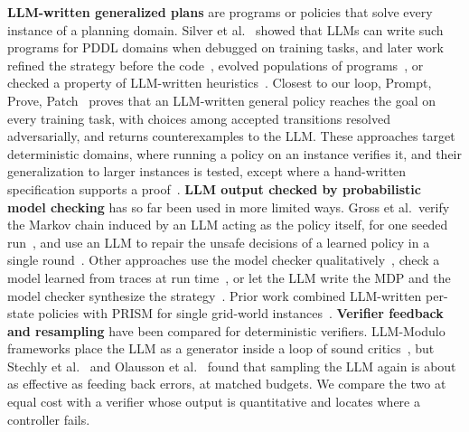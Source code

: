 \textbf{LLM-written generalized plans} are programs or policies that solve every instance of a planning domain.
Silver et al.~\cite{TODO-Silver2024-GenPlan-LLM} showed that LLMs can write such programs for PDDL domains when debugged on training tasks, and later work refined the strategy before the code~\cite{TODO-Stein2026-strategy-refinement}, evolved populations of programs~\cite{TODO-Murray2026-GenePlan}, or checked a property of LLM-written heuristics~\cite{TODO-Pereira2026-property-guided}.
Closest to our loop, Prompt, Prove, Patch~\cite{TODO-Drexler2026-PromptProvePatch} proves that an LLM-written general policy reaches the goal on every training task, with choices among accepted transitions resolved adversarially, and returns counterexamples to the LLM.
These approaches target deterministic domains, where running a policy on an instance verifies it, and their generalization to larger instances is tested, except where a hand-written specification supports a proof~\cite{TODO-Stein2026-provably-complete}.
\textbf{LLM output checked by probabilistic model checking} has so far been used in more limited ways.
Gross et al.\ verify the Markov chain induced by an LLM acting as the policy itself, for one seeded run~\cite{TODO-Gross2025-verifying-LLM-decisions}, and use an LLM to repair the unsafe decisions of a learned policy in a single round~\cite{TODO-Gross2024-counterfactual-LLM}.
Other approaches use the model checker qualitatively~\cite{TODO-Lee2025-VeriPlan}, check a model learned from traces at run time~\cite{TODO-Wang2026-Pro2Guard}, or let the LLM write the MDP and the model checker synthesize the strategy~\cite{TODO-Saccon2025-MDP-generation}.
Prior work combined LLM-written per-state policies with PRISM for single grid-world instances~\cite{TODO-predecessor-LLMTrust2026}.
\textbf{Verifier feedback and resampling} have been compared for deterministic verifiers.
LLM-Modulo frameworks place the LLM as a generator inside a loop of sound critics~\cite{TODO-Kambhampati2024-LLM-Modulo}, but Stechly et al.~\cite{TODO-Stechly2025-self-verification} and Olausson et al.~\cite{TODO-Olausson2024-self-repair} found that sampling the LLM again is about as effective as feeding back errors, at matched budgets.
We compare the two at equal cost with a verifier whose output is quantitative and locates where a controller fails.


